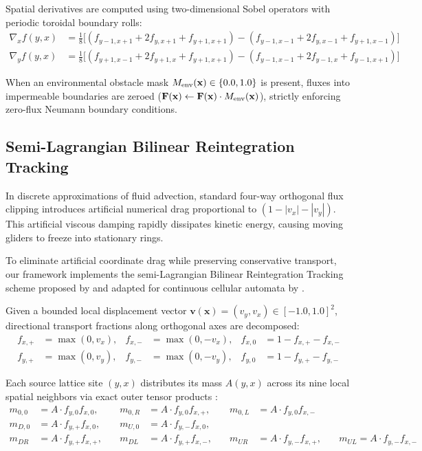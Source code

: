 Spatial derivatives are computed using two-dimensional Sobel operators with periodic toroidal boundary rolls:
\begin{align}
\nabla_x f(y, x) &= \frac{1}{8} \Big[ (f_{y-1, x+1} + 2f_{y, x+1} + f_{y+1, x+1}) - (f_{y-1, x-1} + 2f_{y, x-1} + f_{y+1, x-1}) \Big] \label{eq:sobel_x} \\
\nabla_y f(y, x) &= \frac{1}{8} \Big[ (f_{y+1, x-1} + 2f_{y+1, x} + f_{y+1, x+1}) - (f_{y-1, x-1} + 2f_{y-1, x} + f_{y-1, x+1}) \Big] \label{eq:sobel_y}
\end{align}

When an environmental obstacle mask $M_{\text{env}}(\mathbf{x}) \in \{0.0, 1.0\}$ is present, fluxes into impermeable boundaries are zeroed ($\mathbf{F}(\mathbf{x}) \leftarrow \mathbf{F}(\mathbf{x}) \cdot M_{\text{env}}(\mathbf{x})$), strictly enforcing zero-flux Neumann boundary conditions.

\subsection{Semi-Lagrangian Bilinear Reintegration Tracking}
\label{subsec:model_moroz_advection}

In discrete approximations of fluid advection, standard four-way orthogonal flux clipping introduces artificial numerical drag proportional to $(1 - |v_x| - |v_y|)$. This artificial viscous damping rapidly dissipates kinetic energy, causing moving gliders to freeze into stationary rings.

To eliminate artificial coordinate drag while preserving conservative transport, our framework implements the semi-Lagrangian Bilinear Reintegration Tracking scheme proposed by \textcite{moroz2020reintegration} and adapted for continuous cellular automata by \textcite{plantec2025flowlenia}.

Given a bounded local displacement vector $\mathbf{v}(\mathbf{x}) = (v_y, v_x) \in [-1.0, 1.0]^2$, directional transport fractions along orthogonal axes are decomposed:
\begin{align}
f_{x,+} &= \max(0, v_x), & f_{x,-} &= \max(0, -v_x), & f_{x,0} &= 1 - f_{x,+} - f_{x,-} \label{eq:fractions_x} \\
f_{y,+} &= \max(0, v_y), & f_{y,-} &= \max(0, -v_y), & f_{y,0} &= 1 - f_{y,+} - f_{y,-} \label{eq:fractions_y}
\end{align}

Each source lattice site $(y, x)$ distributes its mass $A(y, x)$ across its nine local spatial neighbors via exact outer tensor products \parencite{moroz2020reintegration}:
\begin{equation}
\begin{alignedat}{3}
m_{0,0} &= A \cdot f_{y,0} f_{x,0}, &\quad m_{0,R} &= A \cdot f_{y,0} f_{x,+}, &\quad m_{0,L} &= A \cdot f_{y,0} f_{x,-} \\
m_{D,0} &= A \cdot f_{y,+} f_{x,0}, &\quad m_{U,0} &= A \cdot f_{y,-} f_{x,0}, & & \\
m_{DR} &= A \cdot f_{y,+} f_{x,+}, &\quad m_{DL} &= A \cdot f_{y,+} f_{x,-}, &\quad m_{UR} &= A \cdot f_{y,-} f_{x,+}, &\quad m_{UL} = A \cdot f_{y,-} f_{x,-}
\end{alignedat}
\label{eq:bilinear_splatting}
\end{equation}

